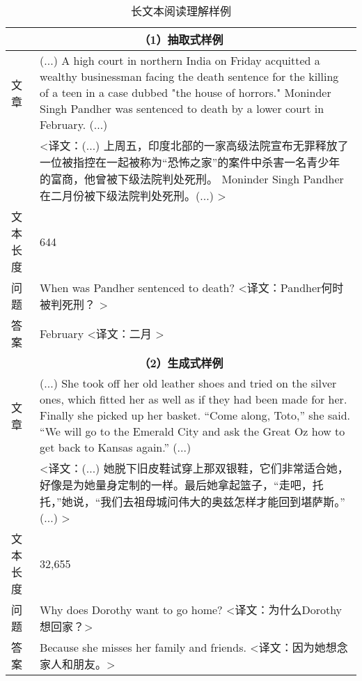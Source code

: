 \begin{table}[]
    \centering
    \caption{长文本阅读理解样例}
    \begin{tabular}{p{48pt}|p{360pt}}
         \multicolumn{2}{c}{\bfseries （1）抽取式样例} \\
         \hline
         文章 & (...) A high court in northern India on Friday acquitted a wealthy businessman facing the death sentence for the killing of a teen in a case dubbed "the house of horrors." Moninder Singh Pandher was sentenced to death by a lower court in February. (...) \\
          & <译文：(...) 上周五，印度北部的一家高级法院宣布无罪释放了一位被指控在一起被称为“恐怖之家”的案件中杀害一名青少年的富商，他曾被下级法院判处死刑。 Moninder Singh Pandher在二月份被下级法院判处死刑。(...) > \\
         \hline
         文本长度 & 644 \\
         \hline
         问题 & When was Pandher sentenced to death? <译文：Pandher何时被判死刑？ > \\
         \hline
         答案 & February <译文：二月 > \\
         \hline
         \multicolumn{2}{c}{\bfseries （2）生成式样例} \\
         \hline
         文章 & (...) She took off her old leather shoes and tried on the silver ones, which fitted her as well as if they had been made for her. Finally she picked up her basket. “Come along, Toto,” she said. “We will go to the Emerald City and ask the Great Oz how to get back to Kansas again.” (...) \\
          & <译文：(...) 她脱下旧皮鞋试穿上那双银鞋，它们非常适合她，好像是为她量身定制的一样。最后她拿起篮子，“走吧，托托，”她说，“我们去祖母城问伟大的奥兹怎样才能回到堪萨斯。” (...) > \\
         \hline
         文本长度 & 32,655 \\
         \hline
         问题 & Why does Dorothy want to go home? <译文：为什么Dorothy想回家？> \\
         \hline
         答案 & Because she misses her family and friends. <译文：因为她想念家人和朋友。> \\

\end{tabular}
\end{table}

